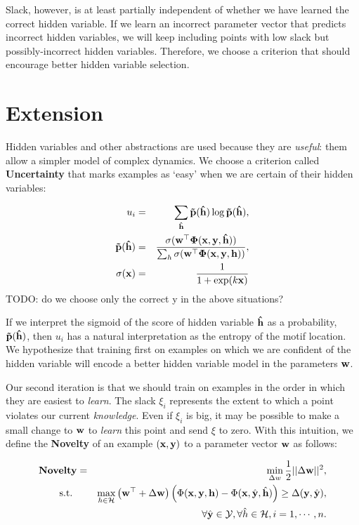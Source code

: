 \documentclass{article}
\newcommand{\mysection}[1]{\vspace{-4mm}\section{#1}\vspace{-4mm}}
\begin{document}
Slack, however, is at least partially independent of whether we have learned the correct hidden variable.  If we learn an incorrect parameter vector that predicts incorrect hidden variables, we will keep including points with low slack but possibly-incorrect hidden variables.  Therefore, we choose a criterion that should encourage better hidden variable selection.

\mysection{Extension}
\label{sec:Extension}
Hidden variables and other abstractions are used because they are \emph{useful}: them allow a simpler model of complex dynamics.  We choose a criterion called \textbf{Uncertainty} that marks examples as `easy' when we are certain of their hidden variables:

\begin{eqnarray}
u_i &=& \sum_{\bf\hat{h}} \bf\tilde p({\hat h}) \log\bf\tilde p(\bf{\hat h}), \nonumber \\
\bf{\tilde{p}(\hat h)} &=&\frac{\sigma(\bf{w}^\top\Phi(\bf x,y,\hat h))}{\sum_{h}\sigma(\bf w^\top\Phi(\bf x,\bf y,\bf h))}, \nonumber \\
\sigma(\bf x) &=& \frac{1}{1+\exp(k\bf x)}
\label{eq:uncertainty}
\end{eqnarray}
TODO: do we choose only the correct y in the above situations?

If we interpret the sigmoid of the score of hidden variable $\bf \hat h$ as a probability, $\bf\tilde p(\bf \hat h)$, then $u_i$ has a natural interpretation as the entropy of the motif location.  We hypothesize that training first on examples on which we are confident of the hidden variable will encode a better hidden variable model in the parameters $\bf w$.

Our second iteration is that we should train on examples in the order in which they are easiest to \emph{learn}.  The slack $\xi_i$ represents the extent to which a point violates our current \emph{knowledge}.  Even if $\xi_i$ is big, it may be possible to make a small change to $\bf w$ to \emph{learn} this point and send $\xi$ to zero.  With this intuition, we define the \textbf{Novelty} of an example $(\bf x, \bf y)$ to a parameter vector $\bf w$ as follows:

\begin{eqnarray}
\textbf{Novelty}&=&\min_{\Delta w} \frac{1}{2}||{\Delta\bf w}||^2, \nonumber \\
\mbox{s.t. } && \max_{h \in {\cal H}} \left( {\bf w}^\top + \Delta\bf w \right) \left(\Phi({\bf x},{\bf y},{\bf h}) - 
		\Phi({\bf x},\hat{\bf y},\hat{\bf h}) \right)
	 \geq \Delta({\bf y},\hat{\bf y}) , \nonumber \\
\label{eq:novelty}
&&\forall \hat{\bf y} \in {\cal Y}, \forall \hat{h} \in {\cal H}, i=1,\cdots,n.
\end{eqnarray}
\end{document}
